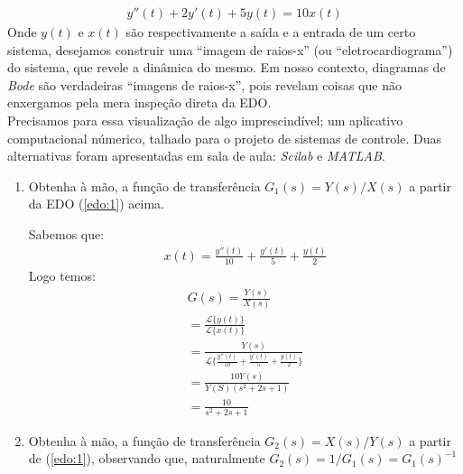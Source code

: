 \documentclass[12pt,a4paper]{article}
\begin{document}
\begin{align}
  y''(t)+2y'(t)+5y(t)=10x(t)
  \label{edo:1}
\end{align}
Onde $y(t)$ e $x(t)$ são respectivamente a saída e a entrada de um certo sistema, desejamos
construir uma ``imagem de raios-x” (ou ``eletrocardiograma”) do sistema, que revele a
dinâmica do mesmo. Em nosso contexto, diagramas de \emph{Bode} são verdadeiras ``imagens
de raios-x”, pois revelam coisas que não enxergamos pela mera inspeção direta da EDO.\\
Precisamos para essa visualização de algo imprescindível; um aplicativo computacional
númerico, talhado para o projeto de sistemas de controle. Duas alternativas foram apresentadas
em sala de aula: \emph{Scilab} e \emph{MATLAB}.
\begin{enumerate}
  \item Obtenha à mão, a função de transferência $G_{1}(s)= Y(s)/X(s)$ a partir 
    da EDO (\ref{edo:1}) acima.

    Sabemos que:
    \begin{align}
      x(t)=\frac{y''(t)}{10}+\frac{y'(t)}{5}+\frac{y(t)}{2} \nonumber
    \end{align} 
    Logo temos:
    \begin{align*}
      G(s)=\frac{Y(s)}{X(s)}\\
      =\frac{\mathcal{L}\{y(t)\}}{\mathcal{L}\{x(t)\}} \\
      =\frac{Y(s)}{\mathcal{L}\{\frac{y''(t)}{10}+\frac{y'(t)}{5}+\frac{y(t)}{2}\}}\\
      = \frac{10Y(s)}{Y(S)(s^2+2s+1)}\\
      = \frac{10}{s^2+2s+1}
    \end{align*}

  \item Obtenha à mão, a função de transferência $G_2(s) = X(s)/Y(s)$ a partir de (\ref{edo:1}), observando
    que, naturalmente $G_2(s) = 1/G_1(s) = G_1(s)^{-1}$


\end{enumerate}
\end{document}
